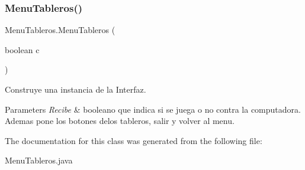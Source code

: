 \subsubsection{\texorpdfstring{Menu\+Tableros()}{MenuTableros()}}
{\footnotesize\ttfamily Menu\+Tableros.\+Menu\+Tableros (\begin{DoxyParamCaption}\item[{boolean}]{c }\end{DoxyParamCaption})}



Construye una instancia de la Interfaz. 


\begin{DoxyParams}{Parameters}
{\em Recibe} & booleano que indica si se juega o no contra la computadora. Ademas pone los botones delos tableros, salir y volver al menu. \\
\hline
\end{DoxyParams}


The documentation for this class was generated from the following file\+:\begin{DoxyCompactItemize}
\item 
Menu\+Tableros.\+java\end{DoxyCompactItemize}
